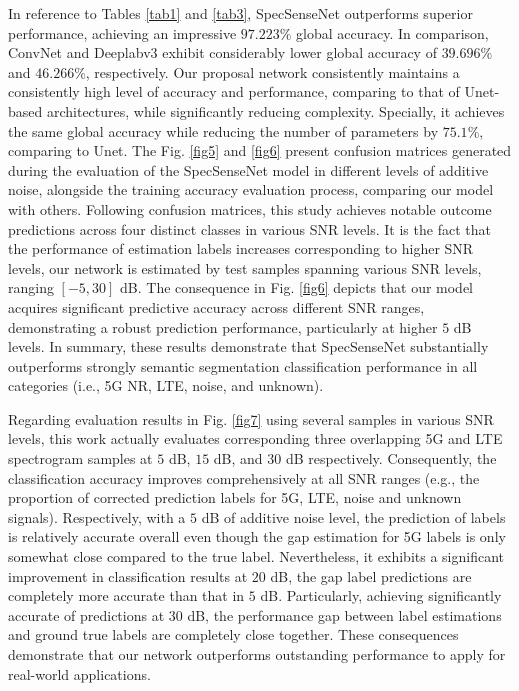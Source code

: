 \documentclass[journal]{IEEEtran} %
\begin{document}
In reference to Tables \ref{tab1} and \ref{tab3}, SpecSenseNet outperforms superior performance, achieving an impressive $97.223\%$ global accuracy. In comparison, ConvNet and Deeplabv3 exhibit considerably lower global accuracy of $39.696\%$ and $46.266\%$, respectively. Our proposal network consistently maintains a consistently high level of accuracy and performance, comparing to that of Unet-based architectures, while significantly reducing complexity. Specially, it achieves the same global accuracy while reducing the number of parameters by $75.1\%$, comparing to Unet. The Fig. \ref{fig5} and \ref{fig6} present confusion matrices generated during the evaluation of the SpecSenseNet model in different levels of additive noise, alongside the training accuracy evaluation process, comparing our model with others. Following confusion matrices, this study achieves notable outcome predictions across four distinct classes in various SNR levels. It is the fact that the performance of estimation labels increases corresponding to higher SNR levels, our network is estimated by test samples spanning various SNR levels, ranging $[-5, 30]$ dB. The consequence in Fig. \ref{fig6} depicts that our model acquires significant predictive accuracy across different SNR ranges, demonstrating a robust prediction performance, particularly at higher $5$ dB levels. In summary, these results demonstrate that SpecSenseNet substantially outperforms strongly semantic segmentation classification performance in all categories (i.e., 5G NR, LTE, noise, and unknown).

Regarding evaluation results in Fig. \ref{fig7} using several samples in various SNR levels, this work actually evaluates corresponding three overlapping 5G and LTE spectrogram samples at $5$ dB, $15$ dB, and $30$ dB respectively. Consequently, the classification accuracy improves comprehensively at all SNR ranges (e.g., the proportion of corrected prediction labels for 5G, LTE, noise and unknown signals). Respectively, with a $5$ dB of additive noise level, the prediction of labels is relatively accurate overall even though the gap estimation for 5G labels is only somewhat close compared to the true label. Nevertheless, it exhibits a significant improvement in classification results at $20$ dB, the gap label predictions are completely more accurate than that in $5$ dB. Particularly, achieving significantly accurate of predictions at $30$ dB, the performance gap between label estimations and ground true labels are completely close together. These consequences demonstrate that our network outperforms outstanding performance to apply for real-world applications.
\end{document}
